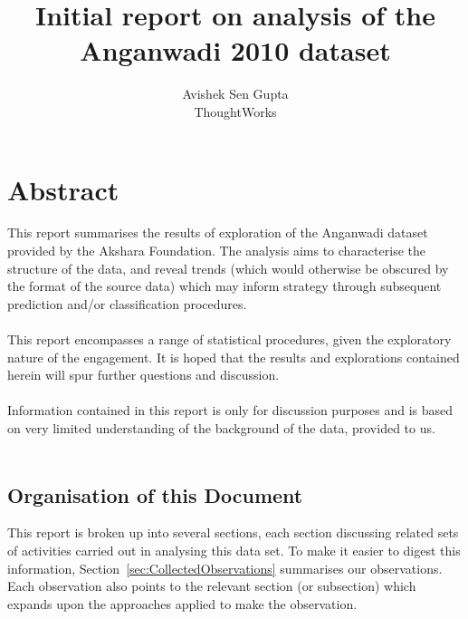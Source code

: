 \documentclass[10pt]{article}
\begin{document}
\fancyfoot{}
\title{\textbf{Initial report on analysis of the Anganwadi 2010 dataset}} 
\author{Avishek Sen Gupta\\ThoughtWorks\\}
\maketitle
\thispagestyle{fancy}

\newpage
\fancyfoot{}
\pagestyle{fancy}
\fancyfoot[CO,CE]{\thepage}

\tableofcontents
\listoffigures
\listoftables
\newpage
\section{Abstract}
This report summarises the results of exploration of the Anganwadi dataset provided by the Akshara Foundation. The analysis aims to characterise the structure of the data, and reveal trends (which would otherwise be obscured by the format of the source data) which may inform strategy through subsequent prediction and/or classification procedures.\\\\
This report encompasses a range of statistical procedures, given the exploratory nature of the engagement. It is hoped that the results and explorations contained herein will spur further questions and discussion.\\\\
Information contained in this report is only for discussion purposes and is based on very limited understanding of the background of the data, provided to us.\\\\
\subsection{Organisation of this Document}
This report is broken up into several sections, each section discussing related sets of activities carried out in analysing this data set. To make it easier to digest this information, Section~\ref{sec:CollectedObservations} summarises our observations. Each observation also points to the relevant section (or subsection) which expands upon the approaches applied to make the observation.
\newpage
\end{document}

